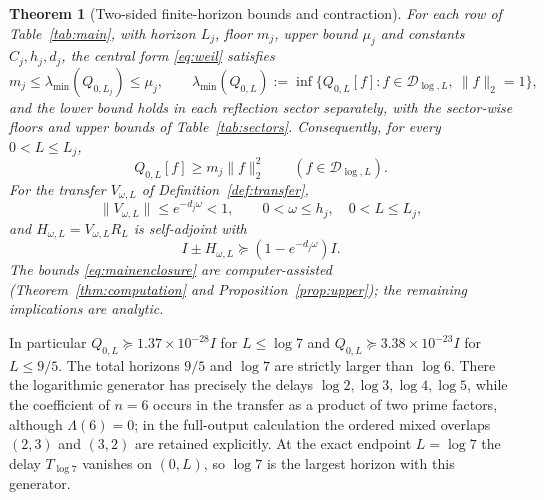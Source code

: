 \documentclass[11pt]{article}
\numberwithin{equation}{section}
\newtheorem{theorem}{Theorem}[section]
\theoremstyle{definition}
\theoremstyle{remark}
\newcommand{\DD}{\mathcal D}
\newcommand{\norm}[1]{\lVert#1\rVert}
\begin{document}
\begin{theorem}[Two-sided finite-horizon bounds and contraction]\label{thm:main}
For each row of Table~\ref{tab:main}, with horizon $L_j$, floor $m_j$, upper
bound $\mu_j$ and constants $C_j,h_j,d_j$, the central form \eqref{eq:weil}
satisfies
\begin{equation}\label{eq:mainenclosure}
 m_j\le\lambda_{\min}(Q_{0,L_j})\le\mu_j,\qquad
 \lambda_{\min}(Q_{0,L}):=\inf\{Q_{0,L}[f]:f\in\DD_{\log,L},\ \norm f_2=1\},
\end{equation}
and the lower bound holds in each reflection sector separately, with the
sector-wise floors and upper bounds of Table~\ref{tab:sectors}. Consequently,
for every $0<L\le L_j$,
\begin{equation}\label{eq:maincentral}
 Q_{0,L}[f]\ge m_j\norm f_2^2\qquad(f\in\DD_{\log,L}).
\end{equation}
For the transfer $V_{\omega,L}$ of Definition~\ref{def:transfer},
\begin{equation}\label{eq:maintransfer}
 \norm{V_{\omega,L}}\le e^{-d_j\omega}<1,
 \qquad 0<\omega\le h_j,\quad 0<L\le L_j,
\end{equation}
and $H_{\omega,L}=V_{\omega,L}R_L$ is self-adjoint with
\begin{equation}\label{eq:mainreflection}
 I\pm H_{\omega,L}\succeq(1-e^{-d_j\omega})I.
\end{equation}
The bounds \eqref{eq:mainenclosure} are computer-assisted
(Theorem~\ref{thm:computation} and Proposition~\ref{prop:upper}); the
remaining implications are analytic.
\end{theorem}



In particular $Q_{0,L}\succeq1.37\times10^{-28}I$ for $L\le\log7$ and
$Q_{0,L}\succeq3.38\times10^{-23}I$ for $L\le9/5$. The total horizons $9/5$
and $\log7$ are strictly larger than $\log6$. There the logarithmic generator
has precisely the delays $\log2,\log3,\log4,\log5$, while the coefficient of
$n=6$ occurs in the transfer as a product of two prime factors, although
$\Lambda(6)=0$; in the full-output calculation the ordered mixed overlaps
$(2,3)$ and $(3,2)$ are retained explicitly. At the exact endpoint $L=\log7$
the delay $T_{\log7}$ vanishes on $(0,L)$, so $\log7$ is the largest horizon
with this generator.
\end{document}
